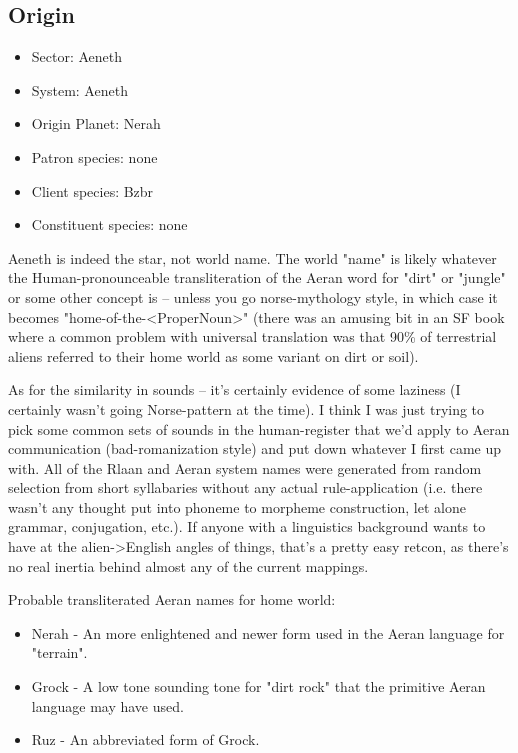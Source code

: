 \subsection{Origin}

\begin{itemize}
\item Sector: Aeneth
\item System: Aeneth
\item Origin Planet: Nerah
\item Patron species: none
\item Client species: Bzbr
\item Constituent species: none 
\end{itemize}

Aeneth is indeed the star, not world name. The world "name" is likely whatever the Human-pronounceable transliteration of the Aeran word for "dirt" or "jungle" or some other concept is -- unless you go norse-mythology style, in which case it becomes "home-of-the-<ProperNoun>" (there was an amusing bit in an SF book where a common problem with universal translation was that 90\% of terrestrial aliens referred to their home world as some variant on dirt or soil).

As for the similarity in sounds -- it's certainly evidence of some laziness (I certainly wasn't going Norse-pattern at the time). I think I was just trying to pick some common sets of sounds in the human-register that we'd apply to Aeran communication (bad-romanization style) and put down whatever I first came up with. All of the Rlaan and Aeran system names were generated from random selection from short syllabaries without any actual rule-application (i.e. there wasn't any thought put into phoneme to morpheme construction, let alone grammar, conjugation, etc.). If anyone with a linguistics background wants to have at the alien->English angles of things, that's a pretty easy retcon, as there's no real inertia behind almost any of the current mappings.

Probable transliterated Aeran names for home world:

\begin{itemize}
\item Nerah - An more enlightened and newer form used in the Aeran language for "terrain".
\item Grock - A low tone sounding tone for "dirt rock" that the primitive Aeran language may have used.
\item Ruz - An abbreviated form of Grock.
\end{itemize}

